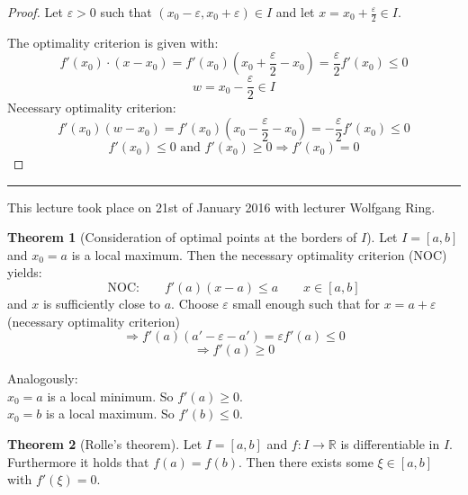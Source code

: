 \documentclass[a4paper,landscape,twocolumn]{article}
\theoremstyle{definition}
\newtheorem{theorem}{Theorem}
\newcommand\meta[3]{\hrule{} This #1 took place on #2 with lecturer #3.\par}
\begin{document}
%
\begin{proof}
  Let $\varepsilon > 0$ such that $(x_0 - \varepsilon, x_0 + \varepsilon) \in I$
  and let $x = x_0 + \frac\varepsilon{2} \in I$.

  The optimality criterion is given with:
  \[ f'(x_0) \cdot (x - x_0) = f'(x_0) \left(x_0 + \frac\varepsilon{2} - x_0\right) = \frac\varepsilon2 f'(x_0) \leq 0 \]
  \[ w = x_0 - \frac\varepsilon2 \in I \]
  Necessary optimality criterion:
  \[
    f'(x_0)(w - x_0) = f'(x_0)\left(x_0 - \frac\varepsilon2 - x_0\right)
    = -\frac{\varepsilon}{2} f'(x_0) \leq 0
  \] \[
    f'(x_0) \leq 0 \text{ and } f'(x_0) \geq 0 \Rightarrow f'(x_0) = 0
  \]
\end{proof}

\meta{lecture}{21st of January 2016}{Wolfgang Ring}

\begin{theorem}[Consideration of optimal points at the borders of $I$]
  Let $I = [a, b]$ and $x_0 = a$ is a local maximum. Then the necessary
  optimality criterion (NOC) yields:
  \[ \text{NOC:} \qquad f'(a) (x - a) \leq a \qquad x \in [a,b] \]
  and $x$ is sufficiently close to $a$. Choose $\varepsilon$ small enough
  such that for $x = a + \varepsilon$ (necessary optimality criterion)
  \[ \Rightarrow f'(a) (a' - \varepsilon - a') = \varepsilon f'(a) \leq 0 \]
  \[ \Rightarrow f'(a) \geq 0 \]

  Analogously: \\
  $x_0 = a$ is a local minimum. So $f'(a) \geq 0$. \\
  $x_0 = b$ is a local maximum. So $f'(b) \leq 0$.
\end{theorem}


\begin{theorem}[Rolle's theorem]
  Let $I = [a,b]$ and $f: I \to \mathbb R$ is differentiable in $I$. Furthermore
  it holds that $f(a) = f(b)$. Then there exists some $\xi \in [a,b]$ with
  $f'(\xi) = 0$.
\end{theorem}
\end{document}
